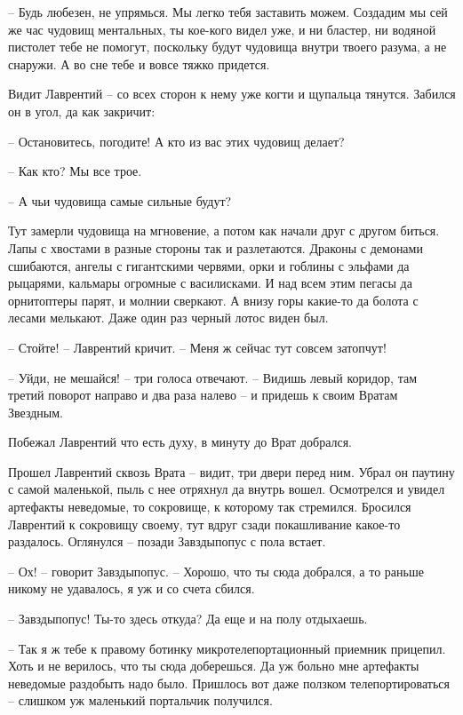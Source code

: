 \documentclass[ebook,oneside,final,openright]{memoir}
\begin{document}
– Будь любезен, не упрямься. Мы легко тебя заставить можем. Создадим мы сей же час чудовищ ментальных, ты кое-кого видел уже, и ни бластер, ни водяной пистолет тебе не помогут, поскольку будут чудовища внутри твоего разума, а не снаружи. А во сне тебе и вовсе тяжко придется.\par
\par
Видит Лаврентий – со всех сторон к нему уже когти и щупальца тянутся. Забился он в угол, да как закричит:\par
– Остановитесь, погодите! А кто из вас этих чудовищ делает?\par
– Как кто? Мы все трое.\par
– А чьи чудовища самые сильные будут?\par
Тут замерли чудовища на мгновение, а потом как начали друг с другом биться. Лапы с хвостами в разные стороны так и разлетаются. Драконы с демонами сшибаются, ангелы с гигантскими червями, орки и гоблины с эльфами да рыцарями, кальмары огромные с василисками. И над всем этим пегасы да орнитоптеры парят, и молнии сверкают. А внизу горы какие-то да болота с лесами мелькают. Даже один раз черный лотос виден был. \par
– Стойте! – Лаврентий кричит. – Меня ж сейчас тут совсем затопчут!\par
– Уйди, не мешайся! – три голоса отвечают. – Видишь левый коридор, там третий поворот направо и два раза налево – и придешь к своим Вратам Звездным.\par
\par
Побежал Лаврентий что есть духу, в минуту до Врат добрался.\par
\par
Прошел Лаврентий сквозь Врата – видит, три двери перед ним. Убрал он паутину с самой маленькой, пыль с нее отряхнул да внутрь вошел. Осмотрелся и увидел артефакты неведомые, то сокровище, к которому так стремился. Бросился Лаврентий к сокровищу своему, тут вдруг сзади покашливание какое-то раздалось. Оглянулся – позади Завздыпопус с пола встает.\par
– Ох! – говорит Завздыпопус. – Хорошо, что ты сюда добрался, а то раньше никому не удавалось, я уж и со счета сбился.\par
– Завздыпопус! Ты-то здесь откуда? Да еще и на полу отдыхаешь.\par
– Так я ж тебе к правому ботинку микротелепортационный приемник прицепил. Хоть и не верилось, что ты сюда доберешься. Да уж больно мне артефакты неведомые раздобыть надо было. Пришлось вот даже ползком телепортироваться – слишком уж маленький портальчик получился.\par
\end{document}
